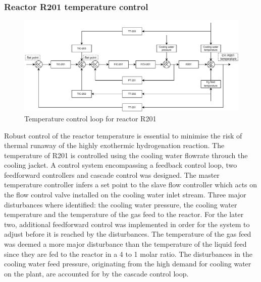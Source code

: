 \subsubsection{Reactor R201 temperature control} %

\begin{figure}[h]
    \centering
    \includegraphics[width=0.8\linewidth]{chapters/4-operation-control/4-Figures/R201-TC.pdf}
    \caption{Temperature control loop for reactor R201}
    \label{fig:R201-TC}
\end{figure}

Robust control of the reactor temperature is essential to minimise the risk of thermal runaway of the highly exothermic hydrogenation reaction. The temperature of R201 is controlled using the cooling water flowrate throuch the cooling jacket. A control system encompassing a feedback control loop, two feedforward controllers and cascade control was designed. The master temperature controller infers a set point to the slave flow controller which acts on the flow control valve installed on the cooling water inlet stream. Three major disturbances where identified: the cooling water pressure, the cooling water temperature and the temperature of the gas feed to the reactor. For the later two, additional feedforward control was implemented in order for the system to adjust before it is reached by the disturbances. The temperature of the gas feed was deemed a more major disturbance than the temperature of the liquid feed since they are fed to the reactor in a 4 to 1 molar ratio. The disturbances in the cooling water feed pressure, originating from the high demand for cooling water on the plant, are accounted for by the cascade control loop.





